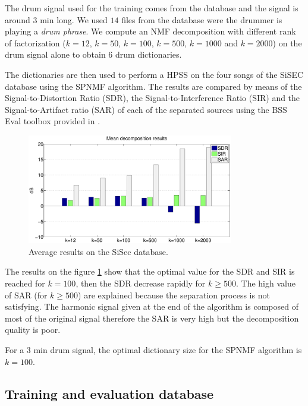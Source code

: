 \documentclass{article}
\begin{document}
The drum signal used for the training comes from the database \cite{gillet2006enst} and the signal is around $3$ min long. We used $14$ files from the database were the drummer is playing a \emph{drum phrase}. We compute an NMF decomposition with different rank of factorization ($k=12$, $k=50$, $k=100$, $k=500$, $k=1000$ and $k=2000$) on the drum signal alone to obtain $6$  drum dictionaries.

The dictionaries are then used to perform a HPSS on the four songs of the SiSEC database using the SPNMF algorithm. The results are compared by means of the Signal-to-Distortion Ratio (SDR), the Signal-to-Interference Ratio (SIR) and the Signal-to-Artifact ratio (SAR) of each of the separated sources using the BSS Eval toolbox provided in \cite{bsseval}.

\begin{figure}[h]

  \centering 
  \includegraphics[width=9cm]{figs/AllDictSizeISMIR.eps}
  \caption{\label{dictsize} Average results on the SiSec database.}
  
\end{figure}

The results on the figure \ref{dictsize} show that the optimal value for the SDR and SIR is reached for $k=100$, then the SDR decrease rapidly for $k\geqslant 500$. The high value of SAR (for $k\geqslant 500$) are explained because the separation process is not satisfying. The harmonic signal given at the end of the algorithm is composed of most of the original signal therefore the SAR is very high but the decomposition quality is poor. 

For a $3$ min drum signal, the optimal dictionary size for the SPNMF algorithm is $k=100$.  

\subsection{Training and evaluation database}\label{database}
\end{document}
